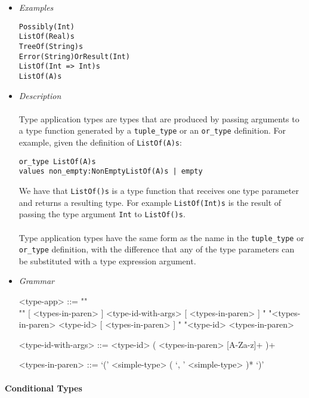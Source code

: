 \documentclass{article}
\begin{document}
\begin{itemize}
\item \textit{Examples}
\begin{verbatim}
Possibly(Int)
ListOf(Real)s
TreeOf(String)s 
Error(String)OrResult(Int)
ListOf(Int => Int)s
ListOf(A)s
\end{verbatim}

\item \textit{Description} \\\\
Type application types are types that are produced by passing arguments
to a type function generated by a \texttt{tuple_type} or an \texttt{or_type}
definition. For example, given the definition of \texttt{ListOf(A)s}:
\begin{verbatim}
or_type ListOf(A)s
values non_empty:NonEmptyListOf(A)s | empty
\end{verbatim}
We have that \texttt{ListOf()s} is a type function that receives one type parameter
and returns a resulting type. For example \texttt{ListOf(Int)s} is the result
of passing the type argument \texttt{Int} to \texttt{ListOf()s}.
\\\\
Type application types have the same form as the name in the
\texttt{tuple_type} or \texttt{or_type} definition, with the difference that
any of the type parameters can be substituted with a type expression argument.

\item \textit{Grammar}
\begin{grammar}
<type-app> ::= ""\\""
[ <types-in-paren> ] <type-id-with-args> [ <types-in-paren> ]
\alt " "<types-in-paren> <type-id> [ <types-in-paren> ]
\alt " "<type-id> <types-in-paren>

<type-id-with-args> ::= 
<type-id> ( <types-in-paren> [A-Za-z]+ )+

<types-in-paren> ::= `(' <simple-type> ( `, ' <simple-type> )* `)'
\end{grammar}
\end{itemize}

\paragraph{Conditional Types}
\end{document}
